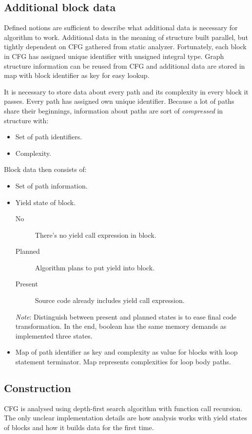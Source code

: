 \subsection{Additional block data}
Defined notions are sufficient to describe what additional data is necessary for algorithm to work. Additional data in the meaning of structure built parallel, but tightly dependent on CFG gathered from static analyzer. Fortunately, each block in CFG has assigned unique identifier with unsigned integral type. Graph structure information can be reused from CFG and additional data are stored in map with block identifier as key for easy lookup.

It is necessary to store data about every path and its complexity in every block it passes. Every path has assigned own unique identifier. Because a lot of paths share their beginnings, information about paths are sort of \emph{compressed} in structure with:
\begin{itemize}
\item{Set of path identifiers.}
\item{Complexity.}
\end{itemize}
Block data then consists of:
\begin{itemize}
\item{Set of path information.}
\item{Yield state of block.}
	\begin{description}
	\item[No]{There's no yield call expression in block.}
	\item[Planned]{Algorithm plans to put yield into block.}
	\item[Present]{Source code already includes yield call expression.}
	\end{description}
	\emph{Note}: Distinguish between present and planned states is to ease final code transformation. In the end, boolean has the same memory demands as implemented three states.
\item{Map of path identifier as key and complexity as value for blocks with loop statement terminator. Map represents complexities for loop body paths.}
\end{itemize}

\subsection{Construction}
CFG is analysed using depth-first search algorithm with function call recursion. The only unclear implementation details are how analysis works with yield states of blocks and how it builds data for the first time.

